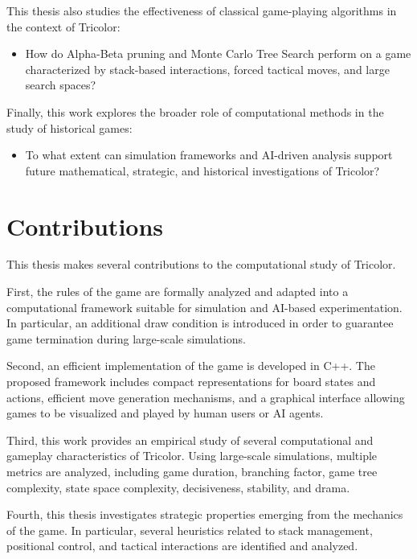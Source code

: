 This thesis also studies the effectiveness of classical game-playing algorithms in the context of Tricolor:

\begin{itemize}
    \item How do Alpha-Beta pruning and Monte Carlo Tree Search perform on a game characterized by stack-based interactions, forced tactical moves, and large search spaces?
\end{itemize}

Finally, this work explores the broader role of computational methods in the study of historical games:

\begin{itemize}
    \item To what extent can simulation frameworks and AI-driven analysis support future mathematical, strategic, and historical investigations of Tricolor?
\end{itemize}

\section{Contributions}

This thesis makes several contributions to the computational study of Tricolor.

First, the rules of the game are formally analyzed and adapted into a computational framework suitable for simulation and AI-based experimentation. In particular, an additional draw condition is introduced in order to guarantee game termination during large-scale simulations.

Second, an efficient implementation of the game is developed in C++. The proposed framework includes compact representations for board states and actions, efficient move generation mechanisms, and a graphical interface allowing games to be visualized and played by human users or AI agents.

Third, this work provides an empirical study of several computational and gameplay characteristics of Tricolor. Using large-scale simulations, multiple metrics are analyzed, including game duration, branching factor, game tree complexity, state space complexity, decisiveness, stability, and drama.

Fourth, this thesis investigates strategic properties emerging from the mechanics of the game. In particular, several heuristics related to stack management, positional control, and tactical interactions are identified and analyzed.

